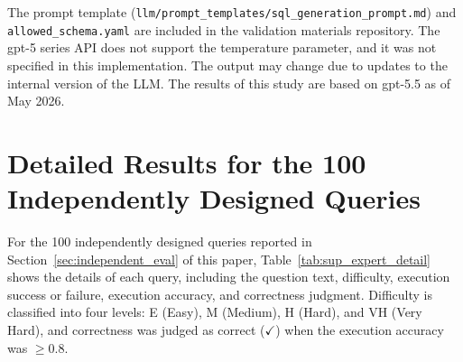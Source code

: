 \documentclass[5p,twocolumn]{elsarticle}
\begin{document}
The prompt template (\texttt{llm/prompt\_templates/sql\_generation\_prompt.md})
and \texttt{allowed\_schema.yaml} are included in the validation materials repository.
The gpt-5 series API does not support the temperature parameter, and it was not specified in this implementation.
The output may change due to updates to the internal version of the LLM.
The results of this study are based on gpt-5.5 as of May 2026.
\section{Detailed Results for the 100 Independently Designed Queries}
\label{sec:sup_expert_queries}

For the 100 independently designed queries reported in Section~\ref{sec:independent_eval} of this paper,
Table~\ref{tab:sup_expert_detail} shows the details of each query, including the question text, difficulty, execution success or failure, execution accuracy, and correctness judgment.
Difficulty is classified into four levels: E (Easy), M (Medium), H (Hard), and VH (Very Hard),
and correctness was judged as correct ($\checkmark$) when the execution accuracy was $\geq 0.8$.
\end{document}
